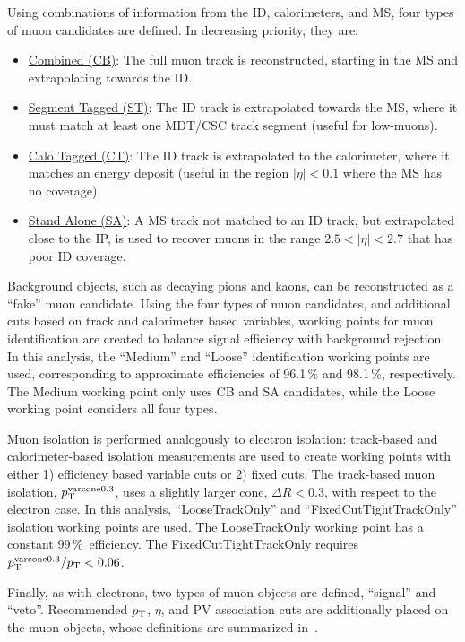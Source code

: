 Using combinations of information from the ID, calorimeters, and MS, four types of muon candidates are defined. In decreasing priority, they are:
\begin{itemize}
	\item \underline{Combined (CB)}: The full muon track is reconstructed, starting in the MS and extrapolating towards the ID.
	\item \underline{Segment Tagged (ST)}: The ID track is extrapolated towards the MS, where it must match at least one MDT/CSC track segment (useful for low-\pT muons).
	\item \underline{Calo Tagged (CT)}: The ID track is extrapolated to the calorimeter, where it matches an energy deposit (useful in the region $|\eta|<0.1$ where the MS has no coverage).
	\item \underline{Stand Alone (SA)}: A MS track not matched to an ID track, but extrapolated close to the IP, is used to recover muons in the range $2.5<|\eta|<2.7$ that has poor ID coverage.
\end{itemize}

Background objects, such as decaying pions and kaons, can be reconstructed as a ``fake'' muon candidate. Using the four types of muon candidates, and additional cuts based on track and calorimeter based variables, working points for muon identification are created to balance signal efficiency with background rejection. In this analysis, the ``Medium'' and ``Loose'' identification working points are used, corresponding to approximate efficiencies of 96.1\,\% and 98.1\,\%, respectively. The Medium working point only uses CB and SA candidates, while the Loose working point considers all four types. 

Muon isolation is performed analogously to electron isolation: track-based and calorimeter-based isolation measurements are used to create working points with either 1) efficiency based variable cuts or 2) fixed cuts. The track-based muon isolation, $p_{\text{T}}^{\textrm{varcone} 0.3}$, uses a slightly larger cone, $\Delta R < 0.3$, with respect to the electron case.  In this analysis, ``LooseTrackOnly'' and ``FixedCutTightTrackOnly'' isolation working points are used. The LooseTrackOnly working point has a constant $99\,\%$\, efficiency. The FixedCutTightTrackOnly requires $p_{\text{T}}^{\textrm{varcone} 0.3}/p_{\text{T}} < 0.06$.

Finally, as with electrons, two types of muon objects are defined, ``signal'' and ``veto''. Recommended $p_{\text{T}}$, $\eta$, and PV association cuts are additionally placed on the muon objects, whose definitions are summarized in~\Tab{\ref{tab:lep_def}}. 

